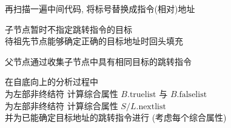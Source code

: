 
\begin{frame}{}
  \begin{center}

    \vspace{0.60cm}

    \pause
    \vspace{0.80cm}
    再扫描一遍中间代码, 将标号替换成指令(相对)地址

    \pause
    \vspace{1.20cm}
  \end{center}
\end{frame}

\begin{frame}{}
  \begin{center}

    \vspace{0.30cm}

    \pause
    \vspace{0.50cm}
    子节点暂时不指定跳转指令的目标 \\[5pt]
    待祖先节点能够确定正确的目标地址时回头填充

    \pause
    \vspace{0.50cm}
    父节点通过收集子节点中具有相同目标的跳转指令
  \end{center}
\end{frame}

\begin{frame}{}
  \begin{center}
    在自底向上的分析过程中 \\[20pt]
    为左部非终结符  计算综合属性 $B.\text{truelist}$ 与 $B.\text{falselist}$ \\[10pt]
    为左部非终结符  计算综合属性 $S/L.\text{nextlist}$ \\[15pt]
    并为已能确定目标地址的跳转指令进行 (考虑每个综合属性)
  \end{center}
\end{frame}


